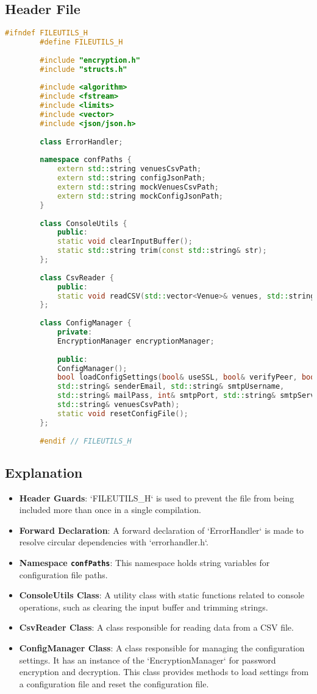 \documentclass{article}
\begin{document}
	\subsection*{Header File}
	\begin{lstlisting}[language=C++]
		#ifndef FILEUTILS_H
		#define FILEUTILS_H
		
		#include "encryption.h"
		#include "structs.h"
		
		#include <algorithm>
		#include <fstream> 
		#include <limits>
		#include <vector>
		#include <json/json.h>
		
		class ErrorHandler;
		
		namespace confPaths {
			extern std::string venuesCsvPath;
			extern std::string configJsonPath;
			extern std::string mockVenuesCsvPath;
			extern std::string mockConfigJsonPath;
		}
		
		class ConsoleUtils {
			public:
			static void clearInputBuffer();
			static std::string trim(const std::string& str);
		};
		
		class CsvReader {
			public:
			static void readCSV(std::vector<Venue>& venues, std::string& venuesCsvPath);
		};
		
		class ConfigManager {
			private:
			EncryptionManager encryptionManager;
			
			public:
			ConfigManager();
			bool loadConfigSettings(bool& useSSL, bool& verifyPeer, bool& verifyHost, bool& verbose, 
			std::string& senderEmail, std::string& smtpUsername, 
			std::string& mailPass, int& smtpPort, std::string& smtpServer, 
			std::string& venuesCsvPath);
			static void resetConfigFile();
		};
		
		#endif // FILEUTILS_H
	\end{lstlisting}
	
	\subsection*{Explanation}
	\begin{itemize}
		\item \textbf{Header Guards}: `FILEUTILS\_H` is used to prevent the file from being included more than once in a single compilation.
		\item \textbf{Forward Declaration}: A forward declaration of `ErrorHandler` is made to resolve circular dependencies with `errorhandler.h`.
		\item \textbf{Namespace \texttt{confPaths}}: This namespace holds string variables for configuration file paths.
		\item \textbf{ConsoleUtils Class}: A utility class with static functions related to console operations, such as clearing the input buffer and trimming strings.
		\item \textbf{CsvReader Class}: A class responsible for reading data from a CSV file.
		\item \textbf{ConfigManager Class}: A class responsible for managing the configuration settings. It has an instance of the `EncryptionManager` for password encryption and decryption. This class provides methods to load settings from a configuration file and reset the configuration file.
	\end{itemize}
	
\end{document}
